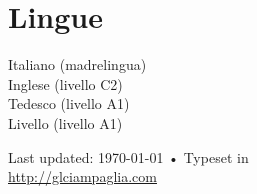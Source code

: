 \documentclass[10pt, letterpaper, italian]{article}
\begin{document}
% 

\section*{Lingue}

Italiano (madrelingua)\\
%
Inglese (livello C2)\\
%
Tedesco (livello A1)\\
%
Livello (livello A1)

\vfill{}

\begin{center}
{\scriptsize  Last updated: \today\- •\- 
Typeset in { \XeTeX}\\
\href{http://glciampaglia.com}{http://glciampaglia.com}}
\end{center}
\end{document}
